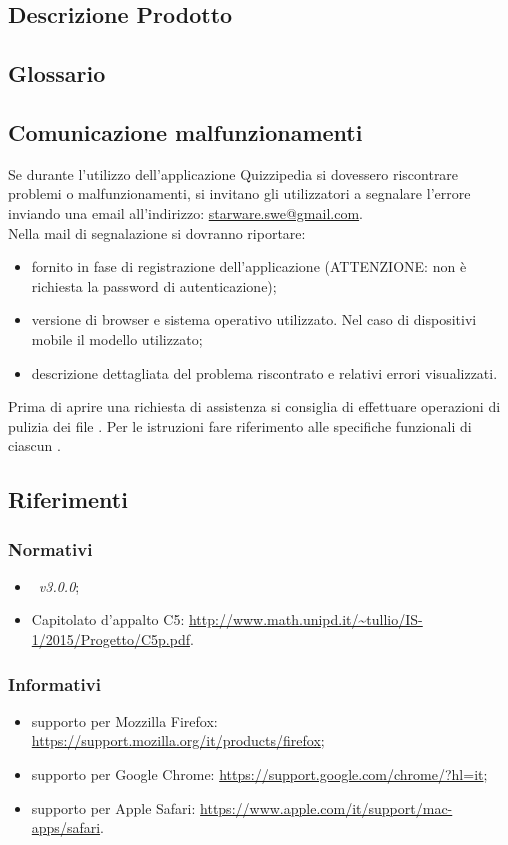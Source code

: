 \documentclass[12pt,a4paper]{article}
\begin{document}
	\subsection{Descrizione Prodotto}
	\descrizioneProdotto
	
	\subsection{Glossario}
	\glossarioPrint
	\subsection{Comunicazione malfunzionamenti}
	Se durante l’utilizzo dell’applicazione Quizzipedia si dovessero riscontrare problemi o 	malfunzionamenti, si invitano gli utilizzatori a segnalare l’errore inviando una email all’indirizzo:
	\url{starware.swe@gmail.com}. \\
	Nella mail di segnalazione si dovranno riportare:
	\begin{itemize}
		\item {} fornito in fase di registrazione dell’applicazione (ATTENZIONE: non è richiesta la password di autenticazione);
		\item versione di browser e sistema operativo utilizzato. Nel caso di dispositivi mobile il modello utilizzato;
		\item descrizione dettagliata del problema riscontrato e relativi errori visualizzati.
	\end{itemize}
	Prima di aprire una richiesta di assistenza si consiglia di effettuare operazioni di pulizia dei file . Per le istruzioni fare riferimento alle specifiche funzionali di ciascun .
	
	\subsection{Riferimenti}
	
\subsubsection{Normativi}
\begin{itemize}
	\item \NdP\ \textit{v3.0.0};
	\item Capitolato d'appalto C5: \url{http://www.math.unipd.it/~tullio/IS-1/2015/Progetto/C5p.pdf}.
\end{itemize}

\subsubsection{Informativi}
\begin{itemize}
	\item supporto per Mozzilla Firefox: \url{https://support.mozilla.org/it/products/firefox};
	\item supporto per Google Chrome: \url{https://support.google.com/chrome/?hl=it};
	\item supporto per Apple Safari: \url{https://www.apple.com/it/support/mac-apps/safari}.
\end{itemize}
\end{document}
